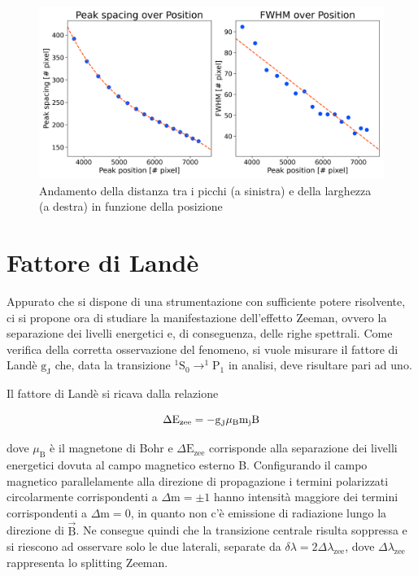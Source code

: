 \documentclass[twocolumn,10pt]{asme2ej}
\begin{document}
\begin{figure}
    \centering
    \includegraphics[width=\linewidth]{../Plots/Boff_spacing_trend.png}
    \caption{Andamento della distanza tra i picchi (a sinistra) e della larghezza (a destra) in funzione della posizione}
    \label{i:spacing_trend_Boff}
    \vspace{-10pt}
\end{figure}




\vspace{-10pt}
\section{Fattore di Landè}\label{s:lande}

Appurato che si dispone di una strumentazione con sufficiente potere risolvente, ci si propone ora di studiare la
manifestazione dell'effetto Zeeman, ovvero la separazione dei livelli energetici e, di conseguenza, delle righe
spettrali. Come verifica della corretta osservazione del fenomeno, si vuole misurare il fattore di Landè
$\text{g}_{\text{J}}$ che, data la transizione $^1\text{S}_0 \rightarrow ^1\text{P}_1$ in analisi, deve risultare pari
ad uno.

Il fattore di Landè si ricava dalla relazione

\vspace{-15pt}
\begin{equation}
    \Delta \text{E}_{\text{zee}} = - \text{g}_{\text{J}} \mu_{\text{B}} \text{m}_{\text{j}} \text{B} 
    \label{e:gL}
\vspace{-5pt}
\end{equation}

dove $\mu_{\text{B}}$ è il magnetone di Bohr e $\Delta \text{E}_{\text{zee}}$ corrisponde alla separazione dei livelli
energetici dovuta al campo magnetico esterno B. Configurando il campo magnetico parallelamente alla direzione di
propagazione i termini polarizzati circolarmente corrispondenti a $\Delta \text{m} = \pm 1$ hanno intensità maggiore dei
termini corrispondenti a $\Delta \text{m} = 0$, in quanto non c'è emissione di radiazione lungo la direzione di $\vec{\text{B}}$.
Ne consegue quindi che la transizione centrale risulta soppressa e si
riescono ad osservare solo le due laterali, separate da $\delta\lambda = 2 \Delta\lambda_{\text{zee}}$, dove
$\Delta\lambda_{\text{zee}}$ rappresenta lo splitting Zeeman. 
\end{document}

